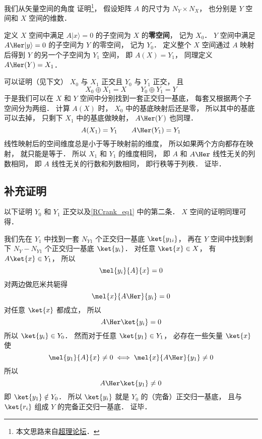 

我们从矢量空间的角度 证明\footnote{本文思路来自\href{https://chaoli.club/index.php/4821}{超理论坛}．}， 假设矩阵 $A$ 的尺寸为 $N_Y \times N_X$， 也分别是 $Y$ 空间和 $X$ 空间的维数．

定义 $X$ 空间中满足 $A |x\rangle = 0$ 的子空间为 $X$ 的\textbf{零空间}， 记为 $X_0$． $Y$ 空间中满足 $A\Her |y\rangle = 0$ 的子空间为 $Y$ 的零空间， 记为 $Y_0$． 定义整个 $X$ 空间通过 $A$ 映射后得到 $Y$ 的另一个子空间为 $Y_1$ 空间， 即 $A(X) = Y_1$， 同理定义 $A\Her(Y) = X_1$． %

可以证明（见下文） $X_0$ 与 $X_1$ 正交且 $Y_0$ 与 $Y_1$ 正交， 且
\begin{equation}\label{RCrank_eq1}
X_0 \oplus X_1 = X
\qquad
Y_0 \oplus Y_1 = Y
\end{equation}
于是我们可以在 $X$ 和 $Y$ 空间中分别找到一套正交归一基底， 每套又根据两个子空间分为两组． 计算 $A(X)$ 时， $X_0$ 中的基底映射后还是零， 所以其中的基底可以去掉， 只剩下 $X_1$ 中的基底做映射， $A\Her(Y)$ 也同理．
\begin{equation}
A(X_1) = Y_1
\qquad
A\Her(Y_1) = Y_1
\end{equation}
线性映射后的空间维度总是小于等于映射前的维度， 所以如果两个方向都存在映射， 就只能是等于． 所以 $X_1$ 和 $Y_1$ 的维度相同， 即 $A$ 和 $A\Her$ 线性无关的列数相同， 即 $A$ 线性无关的行数和列数相同， 即行秩等于列秩． 证毕．

\subsection{补充证明}
以下证明 $Y_0$ 和 $Y_1$ 正交以及\autoref{RCrank_eq1} 中的第二条． $X$ 空间的证明同理可得．

我们先在 $Y_1$ 中找到一套 $N_{Y1}$ 个正交归一基底 $\ket{y_{1i}}$， 再在 $Y$ 空间中找到剩下 $N_Y - N_{Y1}$ 个正交归一基底 $\ket{y_i}$． 对任意 $\ket{x} \in X$， 有 $A \ket{x} \in Y_1$， 所以
\begin{equation}
\mel{y_i}{A}{x} = 0
\end{equation}
对两边做厄米共轭得%
\begin{equation}
\mel{x}{A\Her}{y_i} = 0
\end{equation}
对任意 $\ket{x}$ 都成立， 所以
\begin{equation}
A\Her\ket{y_i} = 0
\end{equation}
所以 $\ket{y_i} \in Y_0$． 然而对于任意 $\ket{y_1} \in Y_1$， 必存在一些矢量 $\ket{x}$ 使
\begin{equation}
\mel{y_1}{A}{x} \ne 0
\iff
\mel{x}{A\Her}{y_1} \ne 0
\end{equation}
所以
\begin{equation}
A\Her\ket{y_1} \ne 0
\end{equation}
即 $\ket{y_1} \notin Y_0$． 所以 $\ket{y_i}$ 就是 $Y_0$ 的（完备）正交归一基底， 且与 $\ket{r_i}$ 组成 $Y$ 的完备正交归一基底． 证毕．
